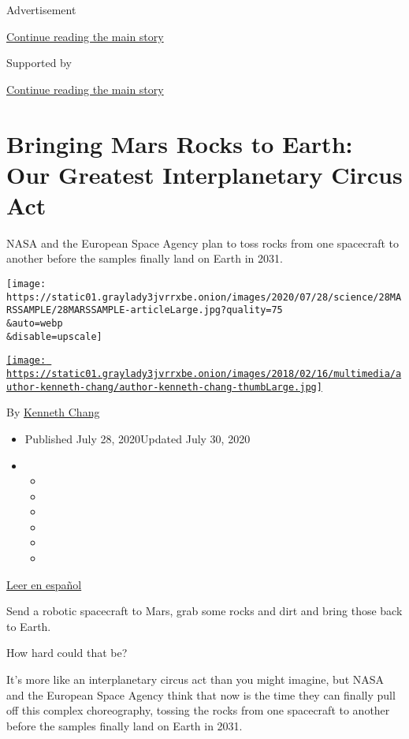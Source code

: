 Advertisement

\protect\hyperlink{after-top}{Continue reading the main story}

Supported by

\protect\hyperlink{after-sponsor}{Continue reading the main story}

\hypertarget{bringing-mars-rocks-to-earth-our-greatest-interplanetary-circus-act}{%
\section{Bringing Mars Rocks to Earth: Our Greatest Interplanetary
Circus
Act}\label{bringing-mars-rocks-to-earth-our-greatest-interplanetary-circus-act}}

NASA and the European Space Agency plan to toss rocks from one
spacecraft to another before the samples finally land on Earth in 2031.

\texttt{[image: https://static01.graylady3jvrrxbe.onion/images/2020/07/28/science/28MARSSAMPLE/28MARSSAMPLE-articleLarge.jpg?quality=75\\\&auto=webp\\\&disable=upscale]}

\href{https://www.nytimes3xbfgragh.onion/by/kenneth-chang}{\texttt{[image: https://static01.graylady3jvrrxbe.onion/images/2018/02/16/multimedia/author-kenneth-chang/author-kenneth-chang-thumbLarge.jpg]}}

By \href{https://www.nytimes3xbfgragh.onion/by/kenneth-chang}{Kenneth
Chang}

\begin{itemize}
\item
  Published July 28, 2020Updated July 30, 2020
\item
  \begin{itemize}
  \item
  \item
  \item
  \item
  \item
  \item
  \end{itemize}
\end{itemize}

\href{https://www.nytimes3xbfgragh.onion/es/2020/07/29/espanol/ciencia-y-tecnologia/mision-marte-nasa.html}{Leer
en español}

Send a robotic spacecraft to Mars, grab some rocks and dirt and bring
those back to Earth.

How hard could that be?

It's more like an interplanetary circus act than you might imagine, but
NASA and the European Space Agency think that now is the time they can
finally pull off this complex choreography, tossing the rocks from one
spacecraft to another before the samples finally land on Earth in 2031.

